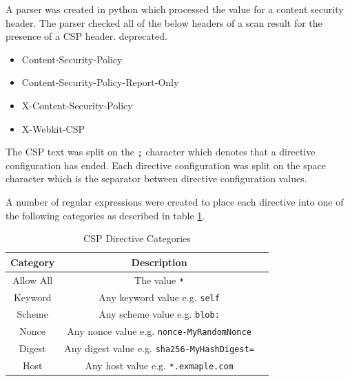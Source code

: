 \documentclass{mscreport}
\begin{document}
A parser was created in python which processed the value for a content security header. The parser checked all of the below headers of a scan result for the presence of a CSP header. deprecated.

\begin{itemize}
	\setlength\itemsep{0.1em}
	\item Content-Security-Policy
	\item Content-Security-Policy-Report-Only
	\item X-Content-Security-Policy
	\item X-Webkit-CSP
\end{itemize}

\noindent
The CSP text was split on the \texttt{;} character which denotes that a directive configuration has ended. Each directive configuration was split on the space character which is the separator between directive configuration values.

\vspace{0.3cm} \noindent
A number of regular expressions were created to place each directive into one of the following categories as described in table \ref{table:directive_categories}.

\begin{table}[H]
  \begin{center}
    \begin{tabular}{|c|c|c|}  %
      \hline
      \textbf{Category} & \textbf{Description}\\
      \hline
      Allow All & The value \texttt{*}\\
      \hline
      Keyword & Any keyword value e.g. \texttt{self}\\
      \hline
      Scheme & Any scheme value e.g. \texttt{blob:}\\
      \hline
      Nonce & Any nonce value e.g. \texttt{nonce-MyRandomNonce}\\
      \hline
      Digest & Any digest value e.g. \texttt{sha256-MyHashDigest=}\\
      \hline
      Host & Any host value e.g. \texttt{*.exmaple.com}\\
      \hline
    \end{tabular}
    \caption{CSP Directive Categories}
    \label{table:directive_categories} %
  \end{center}
\end{table}
\end{document}
